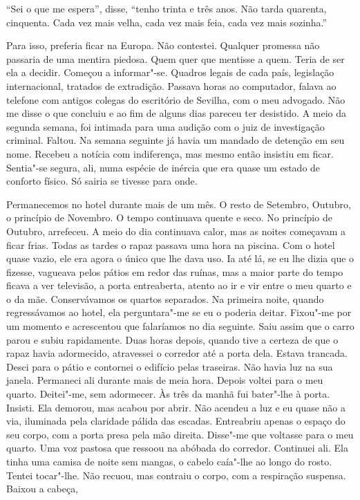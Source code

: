 ``Sei o que me espera'',
disse,
``tenho trinta e três anos. Não tarda quarenta, cinquenta. Cada vez mais
velha, cada vez mais feia, cada vez mais sozinha.''

Para isso, preferia ficar na Europa. Não contestei. Qualquer promessa
não passaria de uma mentira piedosa. Quem quer que mentisse a quem.
Teria de ser ela a decidir. Começou a informar"-se. Quadros legais de
cada país, legislação internacional, tratados de extradição. Passava
horas ao computador, falava ao telefone com antigos colegas do
escritório de Sevilha, com o meu advogado. Não me disse o que concluiu e
ao fim de alguns dias pareceu ter desistido. A meio da segunda semana,
foi intimada para uma audição com o juiz de investigação criminal.
Faltou. Na semana seguinte já havia um mandado de detenção em seu nome.
Recebeu a notícia com indiferença, mas mesmo então insistiu em ficar.
Sentia"-se segura, ali, numa espécie de inércia que era quase um estado
de conforto físico. Só sairia se tivesse para onde.

Permanecemos no hotel durante mais de um mês. O resto de Setembro,
Outubro, o princípio de Novembro. O tempo continuava quente e seco. No
princípio de Outubro, arrefeceu. A meio do dia continuava calor, mas as
noites começavam a ficar frias. Todas as tardes o rapaz passava uma hora
na piscina. Com o hotel quase vazio, ele era agora o único que lhe dava
uso. Ia até lá, se eu lhe dizia que o fizesse, vagueava pelos pátios em
redor das ruínas, mas a maior parte do tempo ficava a ver televisão, a
porta entreaberta, atento ao ir e vir entre o meu quarto e o da mãe.
Conservávamos os quartos separados. Na primeira noite, quando
regressávamos ao hotel, ela perguntara"-me se eu o poderia deitar.
Fixou"-me por um momento e acrescentou que falaríamos no dia seguinte.
Saiu assim que o carro parou e subiu rapidamente. Duas horas depois,
quando tive a certeza de que o rapaz havia adormecido, atravessei o
corredor até a porta dela. Estava trancada. Desci para o pátio e
contornei o edifício pelas traseiras. Não havia luz na sua janela.
Permaneci ali durante mais de meia hora. Depois voltei para o meu
quarto. Deitei"-me, sem adormecer. Às três da manhã fui bater"-lhe à
porta. Insisti. Ela demorou, mas acabou por abrir. Não acendeu a luz e
eu quase não a via, iluminada pela claridade pálida das escadas.
Entreabriu apenas o espaço do seu corpo, com a porta presa pela mão
direita. Disse"-me que voltasse para o meu quarto. Uma voz pastosa que
ressoou na abóbada do corredor. Continuei ali. Ela tinha uma camisa de
noite sem mangas, o cabelo caía"-lhe ao longo do rosto. Tentei
tocar"-lhe. Não recuou, mas contraiu o corpo, com a respiração suspensa.
Baixou a cabeça,

